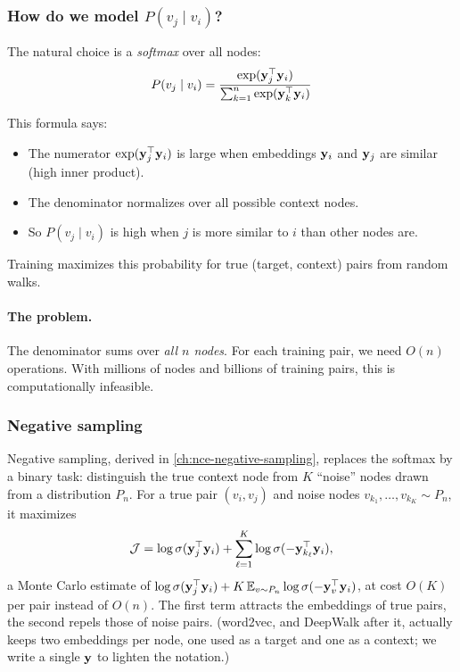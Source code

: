 \begin{notechapter}
\subsubsection*{How do we model $P(v_j \mid v_i)$?}

The natural choice is a \emph{softmax} over all nodes:
\[
P(v_j \mid v_i) = \frac{\exp(\mathbf{y}_j^\top \mathbf{y}_i)}{\sum_{k=1}^{n} \exp(\mathbf{y}_k^\top \mathbf{y}_i)}
\]

\begin{intuition}
This formula says:
\begin{itemize}
    \item The numerator $\exp(\mathbf{y}_j^\top \mathbf{y}_i)$ is large when embeddings $\mathbf{y}_i$ and $\mathbf{y}_j$ are similar (high inner product).
    \item The denominator normalizes over all possible context nodes.
    \item So $P(v_j \mid v_i)$ is high when $j$ is more similar to $i$ than other nodes are.
\end{itemize}
Training maximizes this probability for true (target, context) pairs from random walks.
\end{intuition}

\paragraph{The problem.} The denominator sums over \emph{all $n$ nodes}. For each training pair, we need $O(n)$ operations. With millions of nodes and billions of training pairs, this is computationally infeasible.

\subsubsection*{Negative sampling}

Negative sampling, derived in \cref{ch:nce-negative-sampling}, replaces the softmax by a binary task: distinguish the true context node from $K$ ``noise'' nodes drawn from a distribution $P_n$. For a true pair $(v_i, v_j)$ and noise nodes $v_{k_1}, \ldots, v_{k_K} \sim P_n$, it maximizes
\[
\mathcal{J} = \log \sigma(\mathbf{y}_j^\top \mathbf{y}_i) + \sum_{\ell=1}^{K} \log \sigma(-\mathbf{y}_{k_\ell}^\top \mathbf{y}_i),
\]
a Monte Carlo estimate of $\log\sigma(\mathbf{y}_j^\top\mathbf{y}_i) + K\,\mathbb{E}_{v\sim P_n}\log\sigma(-\mathbf{y}_v^\top\mathbf{y}_i)$, at cost $O(K)$ per pair instead of $O(n)$. The first term attracts the embeddings of true pairs, the second repels those of noise pairs. (word2vec, and DeepWalk after it, actually keeps two embeddings per node, one used as a target and one as a context; we write a single $\mathbf{y}$ to lighten the notation.)


\end{notechapter}
